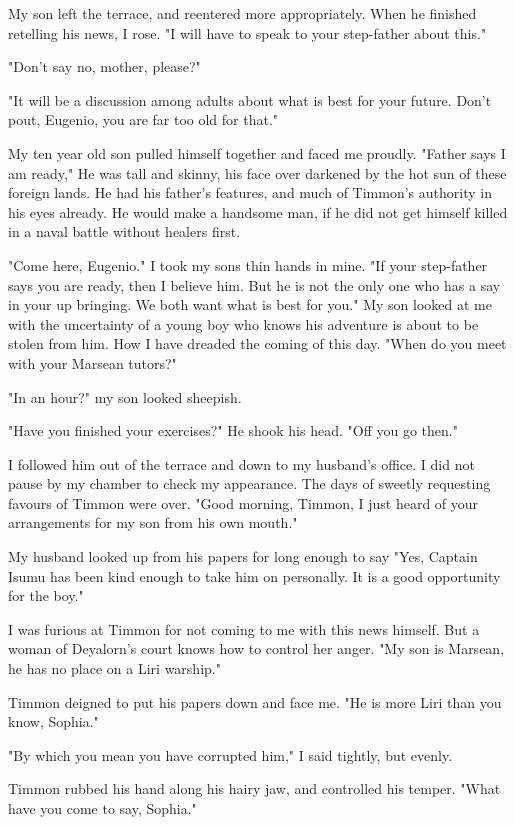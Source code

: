 \documentclass{article}
\begin{document}
My son left the terrace, and reentered more appropriately. When he finished retelling his news, I rose. "I will have to speak to your step-father about this."

"Don't say no, mother, please?"

"It will be a discussion among adults about what is best for your future. Don't pout, Eugenio, you are far too old for that."

My ten year old son pulled himself together and faced me proudly. "Father says I am ready," He was tall and skinny, his face over darkened by the hot sun of these foreign lands. He had his father's features, and much of Timmon's authority in his eyes already. He would make a handsome man, if he did not get himself killed in a naval battle without healers first. 

"Come here, Eugenio." I took my sons thin hands in mine. "If your step-father says you are ready, then I believe him. But he is not the only one who has a say in your up bringing. We both want what is best for you." My son looked at me with the uncertainty of a young boy who knows his adventure is about to be stolen from him. How I have dreaded the coming of this day. "When do you meet with your Marsean tutors?"

"In an hour?" my son looked sheepish.

"Have you finished your exercises?" He shook his head. "Off you go then."

I followed him out of the terrace and down to my husband's office. I did not pause by my chamber to check my appearance. The days of sweetly requesting favours of Timmon were over. "Good morning, Timmon, I just heard of your arrangements for my son from his own mouth."

My husband looked up from his papers for long enough to say "Yes, Captain Isumu has been kind enough to take him on personally. It is a good opportunity for the boy."

I was furious at Timmon for not coming to me with this news himself. But a woman of Deyalorn's court knows how to control her anger. "My son is Marsean, he has no place on a Liri warship."

Timmon deigned to put his papers down and face me. "He is more Liri than you know, Sophia."

"By which you mean you have corrupted him," I said tightly, but evenly.

Timmon rubbed his hand along his hairy jaw, and controlled his temper. "What have you come to say, Sophia."
\end{document}
